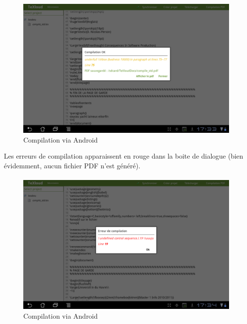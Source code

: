 \documentclass[a4paper,12pt]{article}
\begin{document}
\begin{figure}[!ht]
\begin{center}
  \includegraphics[width=1\textwidth]{./images/screenshot/compil_android.png}
\end{center}
  \caption{Compilation via Android}
  \label{Compilation via Android}
\end{figure}
\clearpage
Les erreurs de compilation apparaissent en rouge dans la boite de dialogue (bien évidemment, aucun fichier PDF n'est généré).

\paragraph*{}
\begin{figure}[!ht]
\begin{center}
  \includegraphics[width=1\textwidth]{./images/screenshot/errorCompil_android.png}
\end{center}
  \caption{Compilation via Android}
  \label{Compilation via Android}
\end{figure}
\end{document}
